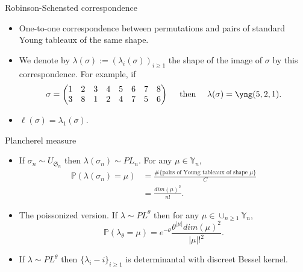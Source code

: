 \documentclass[english,xcolor=table]{beamer}
\begin{document}
\begin{frame}{Robinson-Schensted correspondence}
\begin{itemize}
 
    \item One-to-one correspondence between permutations and pairs of standard Young tableaux of the same shape. 
    \item We denote by $\lambda(\sigma):=(\lambda_i(\sigma))_{i\geq1}$ the shape of the image of  $\sigma$ by this correspondence. 
    For example, if $$\sigma = \begin{pmatrix} 
1 & 2 & 3 & 4 & 5 & 6 & 7 & 8 \\
3 & 8 & 1 & 2 & 4 & 7 & 5 & 6
  \end{pmatrix}  \quad \text { then } \quad \lambda(\sigma)=\yng(5,2,1).$$ 

    \item $\ell(\sigma)=\lambda_1(\sigma).$
\end{itemize}    
\end{frame}

\begin{frame}{Plancherel measure}
\vspace{4 mm}

\begin{itemize}
    \item If $\sigma_n \sim {U}_{\mathfrak{S}_n}$ then $ \lambda(\sigma_n) \sim PL_n$. For any $\mu \in \mathbb{Y}_n$,
    \begin{align*}
    \mathbb{P}(\lambda(\sigma_n)=\mu)&=\frac{\#\{\text{pairs of Young tableaux of shape } \mu\}}{C}\\&=\frac{dim(\mu)^2}{n!}. 
    \end{align*}
    \item The poissonized version. If $ \lambda \sim PL^\theta$ then  for any $\mu \in \cup_{n\geq 1}\mathbb{Y}_n$,
$$    \mathbb{P}(\lambda_\theta=\mu) = e^{-\theta}\frac{\theta^{|\mu|}dim(\mu)^2}{|\mu|!^2}.$$
\item  If  $\lambda \sim PL^\theta$ then $\{\lambda_i-i\}_{i\geq1}$ is determinantal with discreet Bessel kernel. 
\end{itemize}

\end{frame}
\end{document}
